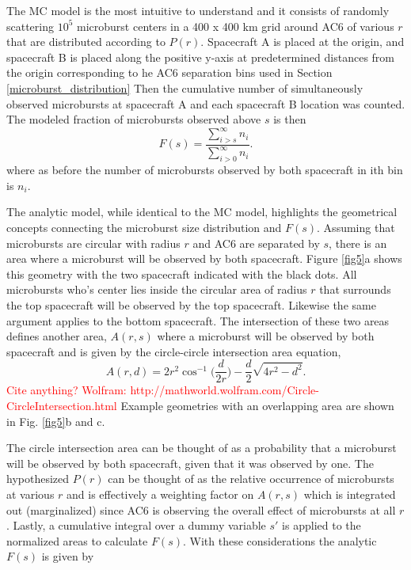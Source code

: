 \documentclass[draft]{agujournal2019}
\begin{document}
The MC model is the most intuitive to understand and it consists of randomly scattering $10^5$ microburst centers in a 400 x 400 km grid around AC6 of various $r$ that are distributed according to $P(r)$. Spacecraft A is placed at the origin, and spacecraft B is placed along the positive y-axis at predetermined distances from the origin corresponding to he AC6 separation bins used in Section \ref{microburst_distribution} Then the cumulative number of simultaneously observed microbursts at spacecraft A and each spacecraft B location was counted. The modeled fraction of microbursts observed above $s$ is then
\begin{equation}
F(s) = \frac{\displaystyle\sum_{i > s}^\infty n_{i} }{ \displaystyle\sum_{i > 0}^\infty n_{i} }.
\end{equation} where as before the number of microbursts observed by both spacecraft in ith bin is $n_{i}$. 

The analytic model, while identical to the MC model, highlights the geometrical concepts connecting the microburst size distribution and $F(s)$. Assuming that microbursts are circular with radius $r$ and AC6 are separated by $s$, there is an area where a microburst will be observed by both spacecraft. Figure \ref{fig5}a shows this geometry with the two spacecraft indicated with the black dots. All microbursts who's center lies inside the circular area of radius $r$ that surrounds the top spacecraft will be observed by the top spacecraft. Likewise the same argument applies to the bottom spacecraft. The intersection of these two areas defines another area, $A(r, s)$ where a microburst will be observed by both spacecraft and is given by the circle-circle intersection area equation, 
\begin{equation}
A(r, d) = 2r^2 \cos^{-1}{\Big( \frac{d}{2r} \Big)} - \frac{d}{2} \sqrt{4r^2 - d^2}.
\end{equation} \textcolor{red}{Cite anything? Wolfram: http://mathworld.wolfram.com/Circle-CircleIntersection.html} Example geometries with an overlapping area are shown in Fig. \ref{fig5}b and c.

The circle intersection area can be thought of as a probability that a microburst will be observed by both spacecraft, given that it was observed by one. The hypothesized $P(r)$ can be thought of as the relative occurrence of microbursts at various $r$ and is effectively a weighting factor on $A(r, s)$ which is integrated out (marginalized) since AC6 is observing the overall effect of microbursts at all $r$. Lastly, a cumulative integral over a dummy variable $s'$ is applied to the normalized areas to calculate $F(s)$. With these considerations the analytic $F(s)$ is given by
\end{document}
